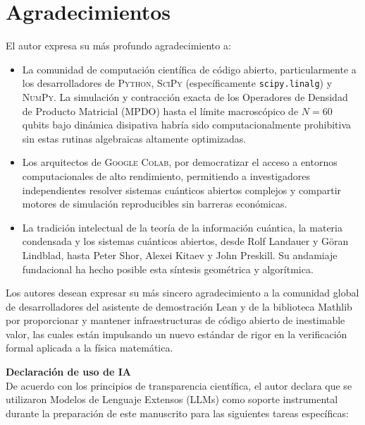 \documentclass[12pt,a4paper]{article}
\theoremstyle{plain}
\theoremstyle{definition}
\theoremstyle{remark}
\begin{document}
\section*{Agradecimientos}
El autor expresa su más profundo agradecimiento a:

\begin{itemize}
    \item La comunidad de computación científica de código abierto, particularmente a los desarrolladores de \textsc{Python}, \textsc{SciPy} (específicamente \texttt{scipy.linalg}) y \textsc{NumPy}. La simulación y contracción exacta de los Operadores de Densidad de Producto Matricial (MPDO) hasta el límite macroscópico de $N=60$ qubits bajo dinámica disipativa habría sido computacionalmente prohibitiva sin estas rutinas algebraicas altamente optimizadas.
    \item Los arquitectos de \textsc{Google Colab}, por democratizar el acceso a entornos computacionales de alto rendimiento, permitiendo a investigadores independientes resolver sistemas cuánticos abiertos complejos y compartir motores de simulación reproducibles sin barreras económicas.
    \item La tradición intelectual de la teoría de la información cuántica, la materia condensada y los sistemas cuánticos abiertos, desde Rolf Landauer y Göran Lindblad, hasta Peter Shor, Alexei Kitaev y John Preskill. Su andamiaje fundacional ha hecho posible esta síntesis geométrica y algorítmica.
\end{itemize}

Los autores desean expresar su más sincero agradecimiento a la comunidad global de desarrolladores del asistente de demostración Lean y de la biblioteca Mathlib por proporcionar y mantener infraestructuras de código abierto de inestimable valor, las cuales están impulsando un nuevo estándar de rigor en la verificación formal aplicada a la física matemática.

\vspace{0.3cm}
\noindent \textbf{Declaración de uso de IA} \\
De acuerdo con los principios de transparencia científica, el autor declara que se utilizaron Modelos de Lenguaje Extensos (LLMs) como soporte instrumental durante la preparación de este manuscrito para las siguientes tareas específicas:
\end{document}
